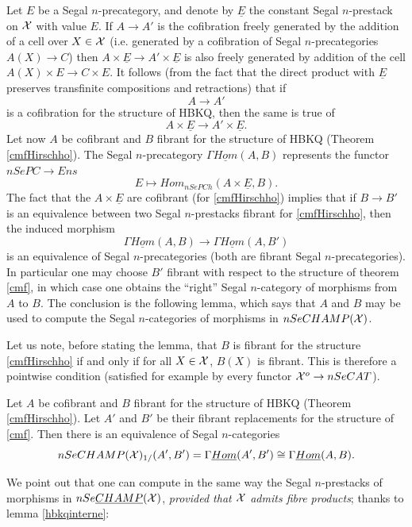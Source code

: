 Let $E$ be a Segal $n$-precategory, and denote by
$\underline{E}$ the constant Segal $n$-prestack on ${\cal X}$ with value $E$.
If $A\rightarrow A'$ is the cofibration freely generated by the addition
of a cell over $X\in {\cal X}$ (i.e. generated by a cofibration of
Segal $n$-precategories $A(X)\rightarrow C$) then $A\times
\underline{E}\rightarrow A'\times \underline{E}$ is also freely generated
by addition of the cell $A(X)\times E \rightarrow C\times E$.
It follows (from the fact that the direct product with $\underline{E}$ preserves
transfinite compositions and retractions) that if
$$
A\rightarrow A'
$$
is a cofibration for the structure of HBKQ, then
the same is true of
$$
A\times
\underline{E}\rightarrow A'\times \underline{E}.
$$
Let now $A$ be cofibrant and $B$ fibrant for the structure of
HBKQ (Theorem \ref{cmfHirschho}). The Segal $n$-precategory
$\Gamma \underline{Hom}(A,B)$ represents the functor $nSePC\rightarrow Ens$
$$
E\mapsto Hom _{nSePCh}(A\times \underline{E}, B).
$$
The fact that the $A\times \underline{E}$ are cofibrant (for
\ref{cmfHirschho})
implies that if $B\rightarrow B'$ is an equivalence between two
Segal $n$-prestacks fibrant for \ref{cmfHirschho}, then the induced
morphism
$$
\Gamma \underline{Hom}(A,B)\rightarrow \Gamma \underline{Hom}(A,B')
$$
is an equivalence of Segal $n$-precategories (both are fibrant
Segal $n$-precategories). In particular
one may choose $B'$
fibrant with respect to the structure of theorem \ref{cmf},
in which case one obtains the
``right'' Segal $n$-category of morphisms from $A$ to $B$. The conclusion
is the following lemma, which says that $A$ and $B$ may be used to
compute the Segal $n$-categories of morphisms in $nSeCHAMP ({\cal X} )$.

Let us note, before stating the lemma, that $B$ is fibrant for the structure
\ref{cmfHirschho} if and only if for all $X\in {\cal X}$, $B(X)$ is fibrant.
This is therefore a pointwise condition (satisfied for example by every
functor ${\cal X} ^o \rightarrow nSeCAT$).

\begin{lemma}
\label{bonhomHirschho}
Let $A$ be cofibrant and $B$ fibrant for the structure of
HBKQ (Theorem \ref{cmfHirschho}). Let $A'$ and $B'$ be
their fibrant replacements for the structure of \ref{cmf}. Then
there is an equivalence of Segal $n$-categories
$$
nSeCHAMP({\cal X} )_{1/}(A',B')=\Gamma \underline{Hom}(A',B')\cong
\Gamma \underline{Hom}(A,B).
$$
\end{lemma}
\eop

We point out that one can compute in the same way the Segal $n$-prestacks
of morphisms in $nSe\underline{CHAMP}({\cal X} )$, {\em provided
that ${\cal X}$ admits fibre products}; thanks to lemma
\ref{hbkqinterne}:

